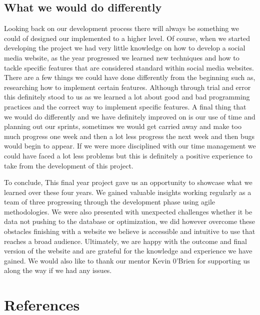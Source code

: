 \section{What we would do differently}
\newline
Looking back on our development process there will always be something we could of designed our implemented to a higher level. Of course, when we started developing the project we had very little knowledge on how to develop a social media website, as the year progressed we learned new techniques and how to tackle specific features that are considered standard within social media websites. There are a few things we could have done differently from the beginning such as, researching how to implement certain features. Although through trial and error this definitely stood to us as we learned a lot about good and bad programming practices and the correct way to implement specific features. A final thing that we would do differently and we have definitely improved on is our use of time and planning out our sprints, sometimes we would get carried away and make too much progress one week and then a lot less progress the next week and then bugs would begin to appear. If we were more disciplined with our time management we could have faced a lot less problems but this is definitely a positive experience to take from the development of this project.
\newline

To conclude, This final year project gave us an opportunity to showcase what we learned over these four years. We gained valuable insights working regularly as a team of three progressing through the development phase using agile methodologies.
We were also presented with unexpected challenges whether it be data not pushing to the database or optimization, we did however overcome these obstacles finishing with a website we believe is accessible and intuitive to use that reaches a broad audience.
\newline
Ultimately, we are happy with the outcome and final version of the website and are grateful for the knowledge and experience we have gained. We would also like to thank our mentor Kevin 0'Brien for supporting us along the way if we had any issues.

\chapter{References}
